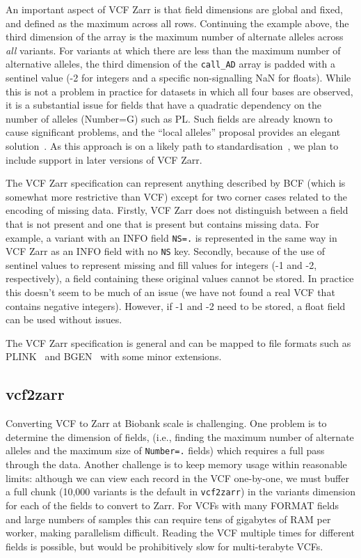 \documentclass[a4paper,num-refs]{oup-contemporary}
\begin{document}
An important aspect of VCF Zarr is that field dimensions are
global and fixed, and defined as the maximum across all rows.
Continuing the example above, the third dimension of the array
is the maximum number of alternate alleles across \emph{all}
variants. For variants at which there are less than the maximum
number of alternative alleles, the third dimension of the
\texttt{call\_AD} array
is padded with a sentinel value (-2 for integers and a specific
non-signalling NaN for floats). While this is not a problem
in practice for datasets in which all four bases are observed,
it is a substantial issue for
fields that have a quadratic dependency on the number of alleles
(Number=G) such as PL. Such fields are already known to cause
significant problems, and the ``local alleles'' proposal
provides an elegant solution~\cite{poterba2024scalable}.
As this approach is on a likely path to
standardisation~\cite{danecek2021twelve}, we plan to
include support in later versions of VCF Zarr.

The VCF Zarr specification can represent anything described by BCF
(which is somewhat more restrictive than VCF) except for two corner
cases related to the encoding of missing data. Firstly, VCF Zarr does
not distinguish between a field that is not present and one that
is present but contains missing data. For example, a variant with an
INFO field \texttt{NS=.} is represented in the same way in VCF Zarr
as an INFO field with no \texttt{NS} key. Secondly, because of the use
of sentinel values to represent missing and fill values for integers
(-1 and -2, respectively), a field containing these original values
cannot be stored. In practice this doesn't seem to be much of
an issue (we have not found a real VCF that contains negative
integers). However, if -1 and -2 need to be stored, a float field
can be used without issues.

The VCF Zarr specification is general and can be mapped to
file formats such as PLINK~\citep{purcell2007plink,chang2015second}
and BGEN~\citep{band2018bgen} with some minor extensions.

\subsection{vcf2zarr}
Converting VCF to Zarr at Biobank scale is challenging.
One problem is to determine the dimension of fields,
(i.e., finding the maximum number of alternate alleles and the
maximum size of \texttt{Number=.} fields) which requires a full
pass through the data. Another challenge is to keep
memory usage within reasonable limits: although
we can view each record in the VCF one-by-one,
we must buffer a full chunk (10,000 variants is the default in
\texttt{vcf2zarr})
in the variants dimension for each of the fields to convert to Zarr.
For VCFs with many FORMAT fields and large numbers of samples this can
require tens of gigabytes of RAM per worker, making
parallelism difficult. Reading the VCF multiple times for different fields
is possible, but would be prohibitively slow for multi-terabyte VCFs.
\end{document}
